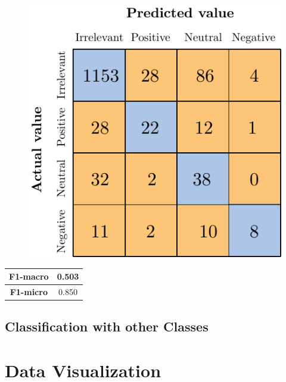 \begin{figure}[H]
	\centering
	\includegraphics[scale=1]{figures/conf_matrices/ita_cascade_bpef/ita_cascade_bpef_tst.pdf}
	\label{fig:ita_cascade_bpef_tst}
\end{figure}

\begin{center}
	\begin{tabular}{ | c | c | } 
		\hline
		\textbf{F1-macro} & 0.503 \\
		\hline
		\textbf{F1-micro} & 0.850 \\ 
		\hline
	\end{tabular}
\end{center}



\subsection{Classification with other Classes}


\section{Data Visualization}